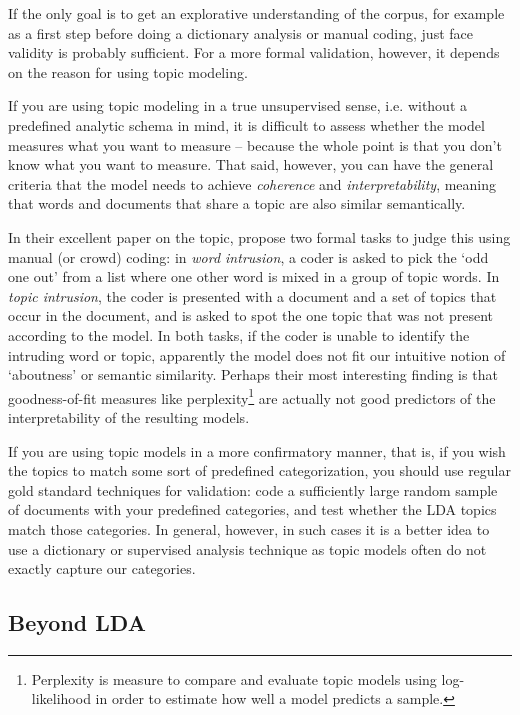 If the only goal is to get an explorative understanding of the corpus,
for example as a first step before doing a dictionary analysis or manual coding,
just face validity is probably sufficient.
For a more formal validation, however, it depends on the reason for using topic modeling.

If you are using topic modeling in a true unsupervised sense, i.e. without a predefined analytic schema in mind,
it is difficult to assess whether the model measures what you want to measure --
because the whole point is that you don't know what you want to measure.
That said, however, you can have the general criteria that the model needs to achieve \emph{coherence}
and \emph{interpretability}, meaning that words and documents that share a topic
are also similar semantically. 

In their excellent paper on the topic, \citet{chang09} propose two formal tasks to judge this
using manual (or crowd) coding: in \emph{word intrusion}, a coder is asked to pick the `odd one out' from a list
where one other word is mixed in a group of topic words.
In \emph{topic intrusion}, the coder is presented with a document and a set of topics that occur in the document,
and is asked to spot the one topic that was not present according to the model.
In both tasks, if the coder is unable to identify the intruding word or topic, apparently the model does not fit
our intuitive notion of `aboutness' or semantic similarity.
Perhaps their most interesting finding is that goodness-of-fit measures like perplexity\footnote{Perplexity is measure to compare and evaluate topic models using log-likelihood in order to estimate how well a model predicts a sample.} 
are actually not good predictors of the interpretability of the resulting models.

If you are using topic models in a more confirmatory manner,
that is, if you wish the topics to match some sort of predefined categorization,
you should use regular gold standard techniques for validation:
code a sufficiently large random sample of documents with your predefined categories,
and test whether the LDA topics match those categories.
In general, however, in such cases it is a better idea to use a dictionary or supervised analysis technique
as topic models often do not exactly capture our categories.


\subsection{Beyond LDA}

